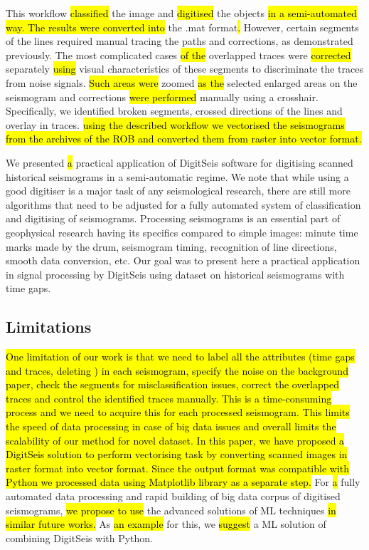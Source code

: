 \documentclass[sensors,article,submit,moreauthors,pdftex]{Definitions/mdpi}
\begin{document}
This workflow \hl{classified }the image and \hl{digitised }the objects \hl{in a semi-automated way. The results were converted into }the .mat format\hl{. }However, certain segments of the lines required manual tracing the paths and corrections, as demonstrated previously. The most complicated cases \hl{of the }overlapped traces\hl{ }were \hl{corrected} separately \hl{using }visual characteristics of these segments\hl{ }to discriminate the traces from noise signals. \hl{Such areas were }zoomed \hl{as the }selected enlarged areas on the seismogram and\hl{ }corrections \hl{were performed }manually using a crosshair. Specifically, we identified broken segments, crossed directions of the lines and overlay in traces. \hl{using the described workflow we vectorised the seismograms from the archives of the ROB and converted them from raster into vector format.}

We presented \hl{a} practical application of DigitSeis software for digitising scanned historical seismograms in a semi-automatic regime. We note that while using a good digitiser is a major task of any seismological research, there are still more algorithms that need to be adjusted for a fully automated system of classification and digitising of seismograms. Processing seismograms is an essential part of geophysical research having its specifics compared to simple images: minute time marks made by the drum, seismogram timing, recognition of line directions, smooth data conversion, etc. Our goal was to present here a practical application in signal processing by DigitSeis using dataset on historical seismograms with time gaps.

\subsection{Limitations}
\hl{One limitation of our work is that we need to label all the attributes (time gaps and traces, deleting ) in each seismogram, specify the noise on the background paper, check the segments for misclassification issues, correct the overlapped traces and control the identified traces manually. This is a time-consuming process and we need to acquire this for each processed seismogram. This limits the speed of data processing in case of big data issues and overall limits the scalability of our method for novel dataset. In this paper, we have proposed a DigitSeis solution to perform vectorising task by converting scanned images in raster format into vector format. Since the output format was compatible with Python we processed data using Matplotlib library as a separate step. }For \hl{a }fully automated data processing and rapid building of big data corpus of digitised seismograms, \hl{we propose to use }the advanced solutions of \ac{ML} techniques\hl{ in similar future works. }As \hl{an example }for this, we \hl{suggest} a \ac{ML} solution of combining DigitSeis with Python. 
\end{document}
